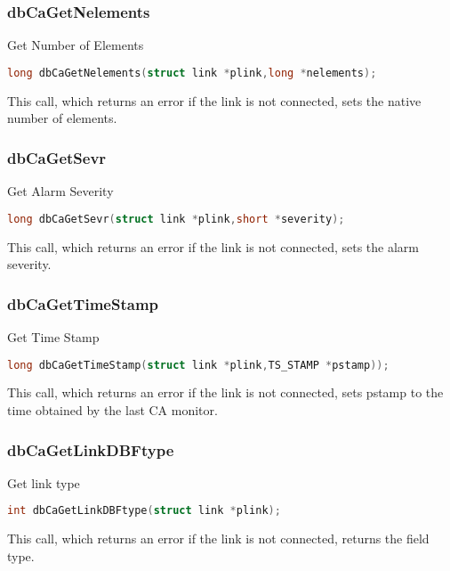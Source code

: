 \subsubsection{dbCaGetNelements}

Get Number of Elements

\begin{lstlisting}[language=C]
long dbCaGetNelements(struct link *plink,long *nelements);
\end{lstlisting}

This call, which returns an error if the link is not connected, sets the native number of elements.

\subsubsection{dbCaGetSevr}

Get Alarm Severity

\begin{lstlisting}[language=C]
long dbCaGetSevr(struct link *plink,short *severity);
\end{lstlisting}

This call, which returns an error if the link is not connected, sets the alarm severity.

\subsubsection{dbCaGetTimeStamp}

Get Time Stamp

\begin{lstlisting}[language=C]
long dbCaGetTimeStamp(struct link *plink,TS_STAMP *pstamp));
\end{lstlisting}

This call, which returns an error if the link is not connected, sets pstamp to the time obtained by the last CA monitor.

\subsubsection{dbCaGetLinkDBFtype}

Get link type

\begin{lstlisting}[language=C]
int dbCaGetLinkDBFtype(struct link *plink);
\end{lstlisting}

This call, which returns an error if the link is not connected, returns the field type.

